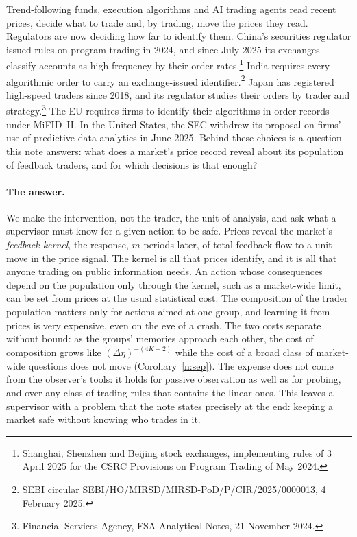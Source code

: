 \documentclass[12pt]{article}
\theoremstyle{definition}
\theoremstyle{remark}
\begin{document}
Trend-following funds, execution algorithms and AI trading agents read recent prices, decide what to trade and, by trading, move the prices they read. Regulators are now deciding how far to identify them. China's securities regulator issued rules on program trading in 2024, and since July 2025 its exchanges classify accounts as high-frequency by their order rates.\footnote{Shanghai, Shenzhen and Beijing stock exchanges, implementing rules of 3 April 2025 for the CSRC Provisions on Program Trading of May 2024.} India requires every algorithmic order to carry an exchange-issued identifier.\footnote{SEBI circular SEBI/HO/MIRSD/MIRSD-PoD/P/CIR/2025/0000013, 4 February 2025.} Japan has registered high-speed traders since 2018, and its regulator studies their orders by trader and strategy.\footnote{Financial Services Agency, FSA Analytical Notes, 21 November 2024.} The EU requires firms to identify their algorithms in order records under MiFID~II. In the United States, the SEC withdrew its proposal on firms' use of predictive data analytics in June 2025. Behind these choices is a question this note answers: what does a market's price record reveal about its population of feedback traders, and for which decisions is that enough?

\paragraph{The answer.} We make the intervention, not the trader, the unit of analysis, and ask what a supervisor must know for a given action to be safe. Prices reveal the market's \emph{feedback kernel}, the response, $m$ periods later, of total feedback flow to a unit move in the price signal. The kernel is all that prices identify, and it is all that anyone trading on public information needs. An action whose consequences depend on the population only through the kernel, such as a market-wide limit, can be set from prices at the usual statistical cost. The composition of the trader population matters only for actions aimed at one group, and learning it from prices is very expensive, even on the eve of a crash. The two costs separate without bound: as the groups' memories approach each other, the cost of composition grows like $(\Delta\eta)^{-(4K-2)}$ while the cost of a broad class of market-wide questions does not move (Corollary~\ref{n:sep}). The expense does not come from the observer's tools: it holds for passive observation as well as for probing, and over any class of trading rules that contains the linear ones. This leaves a supervisor with a problem that the note states precisely at the end: keeping a market safe without knowing who trades in it.
\end{document}
